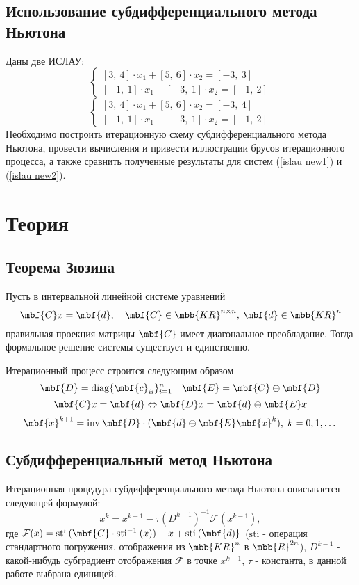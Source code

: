 \documentclass[a4paper]{article}
\begin{document}
\subsection{Использование субдифференциального метода Ньютона}
Даны две ИСЛАУ:
\begin{equation}\label{islau new1}
    \begin{cases}
    [3,\:4]\cdot x_1+[5,\:6]\cdot x_2=[-3,\:3]\\
    [-1,\:1]\cdot x_1 + [-3,\:1]\cdot x_2=[-1,\:2]
    \end{cases}
\end{equation}
\begin{equation}\label{islau new2}
    \begin{cases}
    [3,\:4]\cdot x_1+[5,\:6]\cdot x_2=[-3,\:4]\\
    [-1,\:1]\cdot x_1 + [-3,\:1]\cdot x_2=[-1,\:2]
    \end{cases}
\end{equation}
Необходимо построить итерационную схему субдифференциального метода Ньютона, провести вычисления и привести иллюстрации брусов итерационного процесса, а также сравнить полученные результаты для систем (\ref{islau new1}) и (\ref{islau new2}).
\section{Теория}
\subsection{Теорема Зюзина}
Пусть в интервальной линейной системе уравнений 
$$\mbf{C}x=\mbf{d},\quad \mbf{C}\in\mbb{KR}^{n\times n},\:\mbf{d}\in\mbb{KR}^n$$
правильная проекция матрицы $\mbf{C}$ имеет диагональное преобладание. Тогда формальное решение системы существует и единственно.

Итерационный процесс строится следующим образом
$$\mbf{D}=\mathrm{diag}\{\mbf{c}_{ii}\}_{i=1}^n\quad\mbf{E}=\mbf{C}\ominus\mbf{D}$$
$$\mbf{C}x=\mbf{d}\Leftrightarrow\mbf{D}x=\mbf{d}\ominus\mbf{E}x$$
$$\mbf{x}^{k+1}=\mathrm{inv}\:\mbf{D}\cdot(\mbf{d}\ominus\mbf{E}\mbf{x}^k),\;k=0,1,\dots$$
\subsection{Субдифференциальный метод Ньютона}
Итерационная процедура субдифференциального метода Ньютона описывается следующей формулой:
$$x^k=x^{k-1}-\tau(D^{k-1})^{-1}\mathcal{F}(x^{k-1}),$$
где $\mathcal{F}(x)=\mathrm{sti}\:(\mbf{C}\cdot\mathrm{sti}^{-1}\:(x))-x+\mathrm{sti}\:(\mbf{d)}$ ($\mathrm{sti}$ - операция стандартного погружения, отображения из $\mbb{KR}^n$ в $\mbb{R}^{2n}$), $D^{k-1}$ - какой-нибудь субградиент отображения $\mathcal{F}$ в точке $x^{k-1}$, $\tau$ - константа, в данной работе выбрана единицей.
\end{document}

